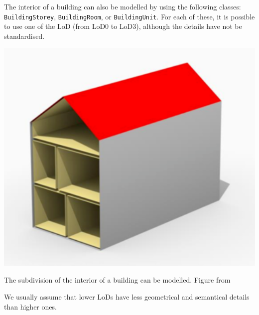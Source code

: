 The interior of a building can also be modelled by using the following classes: \texttt{BuildingStorey}, \texttt{BuildingRoom}, or \texttt{BuildingUnit}.
For each of these, it is possible to use one of the LoD (from LoD0 to LoD3), although the details have not be standardised.
  \begin{marginfigure}
    \centering
    \includegraphics[width=\linewidth]{figs/lod4}
    \caption[The subdivision of the interior of a building can be modelled]{The subdivision of the interior of a building can be modelled. Figure from \citet{Lowner16}}%
  \label{fig:lod4}
  \end{marginfigure}
We usually assume that lower LoDs have less geometrical and semantical details than higher ones.

%

